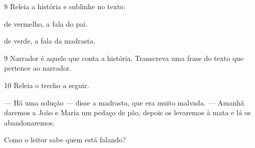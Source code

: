 \num{8} Releia a história e sublinhe no texto:

\begin{escolha}[itemsep=-5pt]
\item de vermelho, a fala do pai.

\item de verde, a fala da madrasta.
\end{escolha}

\num{9} Narrador é aquele que conta a história. Transcreva uma frase do texto que
pertence ao narrador.

\num{10} Releia o trecho a seguir.

\begin{myquote}
--- Há uma solução --- disse a madrasta, que era muito malvada.
--- Amanhã daremos a João e Maria um pedaço de pão, depois os levaremos
à mata e lá os abandonaremos.
\end{myquote}

Como o leitor sabe quem está falando?



